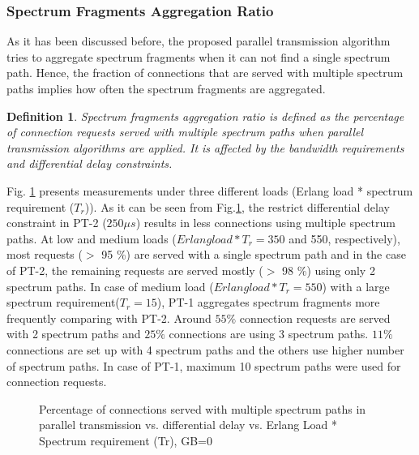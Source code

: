 \documentclass[conference]{IEEEtran}
\newtheorem{definition}{Definition}
\begin{document}
\subsubsection{Spectrum Fragments Aggregation Ratio}
As it has been discussed before, the proposed parallel transmission algorithm tries to aggregate spectrum fragments 
when it can not find a single spectrum path.  Hence, the fraction of connections that are served with multiple spectrum paths implies how often the spectrum fragments are aggregated.  
\begin{definition}
\emph{Spectrum fragments aggregation ratio} is defined as the percentage of connection requests served with multiple spectrum paths when parallel transmission algorithms are applied. It is affected by the bandwidth requirements and differential delay constraints.  
\end{definition}
Fig. \ref{resfigMPPercent} presents measurements under three different loads (Erlang load * spectrum requirement ($T_r$)). 
As it can be seen from Fig.\ref{resfigMPPercent}, the restrict differential delay constraint in PT-2 ($250\mu s$) results in less connections using multiple spectrum paths. At low and medium loads ($Erlang load*T_r=350$ and 550, respectively),  most requests ($>$ 95 \%) are served with a single spectrum path and in the case of PT-2, the remaining requests are served mostly ($>$ 98 \%) using only 2 spectrum paths. In case of medium load ($Erlang load*T_r=550$) with a large spectrum requirement($T_r=15$),  PT-1 aggregates spectrum fragments more frequently comparing with PT-2. Around $55\%$ connection requests are served with 2 spectrum paths and   $25 \%$ connections are using 3 spectrum paths.  $11 \%$ connections are set up with  4 spectrum paths and the others use   higher number of spectrum paths. In case of PT-1, maximum 10 spectrum paths were used for connection requests. 

\begin{figure}
 \caption{Percentage of connections served with multiple spectrum paths in parallel transmission vs. differential delay vs. Erlang Load * Spectrum requirement (Tr), GB=0}
\label{resfigMPPercent}\vspace{-0.3cm}
\end{figure}
\end{document}
